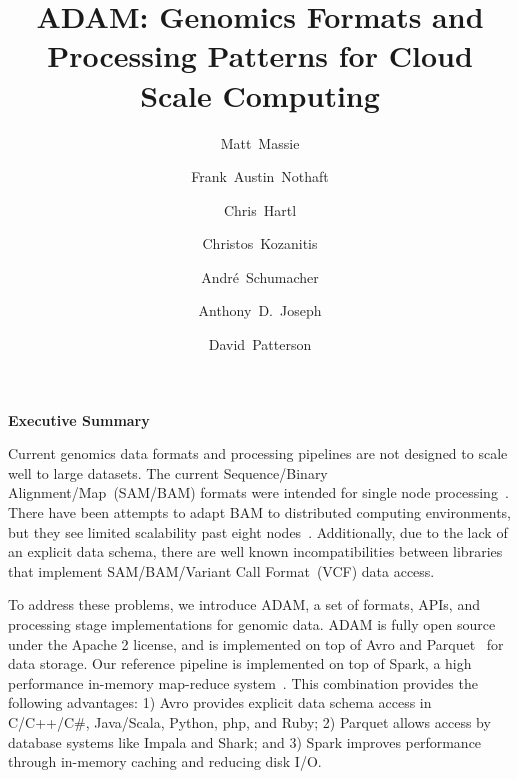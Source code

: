 \documentclass[10pt,twocolumn]{article}
\date{}
\theoremstyle{plain}
\begin{document}
\title{ADAM: Genomics Formats and Processing Patterns for Cloud Scale Computing}
\author[1]{Matt~Massie}
\author[1]{Frank~Austin~Nothaft}
\author[1,2]{Chris~Hartl}
\author[1]{Christos~Kozanitis}
\author[3]{Andr\'{e}~Schumacher}
\author[1]{Anthony~D.~Joseph}
\author[1]{David~Patterson}

\maketitle

\raggedbottom



{\bf Executive Summary}

Current genomics data formats and processing pipelines are not designed to scale well to large datasets. The current
Sequence/Binary Alignment/Map~(SAM/BAM) formats were intended for single node processing~\cite{li09}. There have been
attempts to adapt BAM to distributed computing environments, but they see limited scalability past eight nodes~\cite{niemenmaa12}. 
Additionally, due to the lack of an explicit data schema, there are well known incompatibilities between libraries that implement SAM/BAM/Variant Call Format~(VCF) data access.

To address these problems, we introduce ADAM, a set of formats, APIs, and processing stage implementations for genomic data.
ADAM is fully open source under the Apache 2 license, and is implemented on top of Avro and Parquet~\cite{avro, parquet}
for data storage. Our reference pipeline is implemented on top of Spark, a high performance in-memory map-reduce
system~\cite{zaharia10}. This combination provides the following advantages:
1) Avro provides explicit data schema access in C/C++/C\#, Java/Scala, Python, php, and Ruby; 2) Parquet allows access by database systems like Impala and Shark; and 3) Spark improves performance through in-memory caching and reducing disk I/O.
\end{document}
